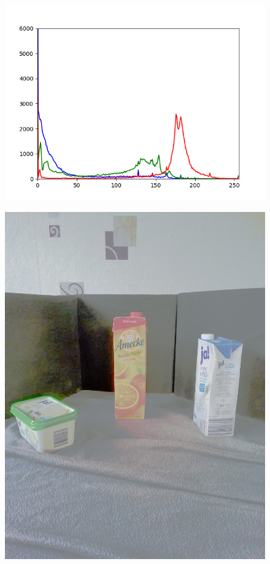\begin{appendices}
\begin{figure}[htb]
\begin{minipage}[c]{0.08\textwidth}
\end{minipage}
\hfill
\begin{minipage}[c]{0.3\textwidth}
\includegraphics[width=\textwidth]{Sources/Bild1_HS_histo.png}
\end{minipage}
\end{figure}
\begin{figure}[htb]
\begin{minipage}[c]{0.2\textwidth}
\includegraphics[width=\textwidth]{Sources/Bild2_HS.jpg}

\end{minipage}
\end{figure}
\end{appendices}
